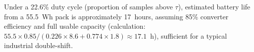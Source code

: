 Under a 22.6\% duty cycle (proportion of samples above $\tau$), estimated battery life
from a 55.5~Wh pack is approximately 17~hours, assuming 85\% converter efficiency and
full usable capacity (calculation: $55.5 \times 0.85 / (0.226 \times 8.6 + 0.774 \times 1.8)
\approx 17.1$~h), sufficient for a typical industrial double-shift.
